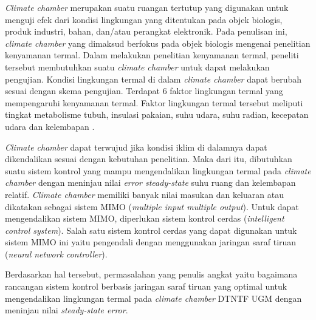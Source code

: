 \textit{Climate chamber} merupakan suatu ruangan tertutup yang digunakan untuk menguji efek dari kondisi lingkungan yang ditentukan pada objek biologis, produk industri, bahan, dan/atau perangkat elektronik. Pada penulisan ini, \textit{climate chamber} yang dimaksud berfokus pada objek biologis mengenai penelitian kenyamanan termal. Dalam melakukan penelitian kenyamanan termal, peneliti tersebut membutuhkan suatu \textit{climate chamber} untuk dapat melakukan pengujian. Kondisi lingkungan termal di dalam \textit{climate chamber} dapat berubah sesuai dengan skema pengujian. Terdapat 6 faktor lingkungan termal yang mempengaruhi kenyamanan termal. Faktor lingkungan termal tersebut meliputi tingkat metabolisme tubuh, insulasi pakaian, suhu udara, suhu radian, kecepatan udara dan kelembapan \cite{ASHRAE55}.

\textit{Climate chamber} dapat terwujud jika kondisi iklim di dalamnya dapat dikendalikan sesuai dengan kebutuhan penelitian. Maka dari itu, dibutuhkan suatu sistem kontrol yang mampu mengendalikan lingkungan termal pada \textit{climate chamber} dengan meninjau nilai \textit{error steady-state} suhu ruang dan kelembapan relatif. \textit{Climate chamber} memiliki banyak nilai masukan dan keluaran atau dikatakan sebagai sistem MIMO (\textit{multiple input multiple output}). Untuk dapat mengendalikan sistem MIMO, diperlukan sistem kontrol cerdas (\textit{intelligent control system}). Salah satu sistem kontrol cerdas yang dapat digunakan untuk sistem MIMO ini yaitu pengendali dengan menggunakan jaringan saraf tiruan (\textit{neural network controller}).


Berdasarkan hal tersebut, permasalahan yang penulis angkat yaitu bagaimana rancangan sistem kontrol berbasis jaringan saraf tiruan yang optimal untuk mengendalikan lingkungan termal pada \textit{climate chamber} DTNTF UGM dengan meninjau nilai \textit{steady-state error}.

